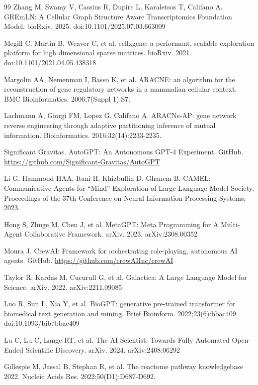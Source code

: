 \documentclass[11pt]{article}
\begin{document}
\begin{thebibliography}{99}
Zhang M, Swamy V, Cassius R, Dupire L, Karaletsos T, Califano A. GREmLN: A Cellular Graph Structure Aware Transcriptomics Foundation Model. bioRxiv. 2025. doi:10.1101/2025.07.03.663009

Megill C, Martin B, Weaver C, et al. cellxgene: a performant, scalable exploration platform for high dimensional sparse matrices. bioRxiv. 2021. doi:10.1101/2021.04.05.438318

Margolin AA, Nemenman I, Basso K, et al. ARACNE: an algorithm for the reconstruction of gene regulatory networks in a mammalian cellular context. BMC Bioinformatics. 2006;7(Suppl 1):S7.

Lachmann A, Giorgi FM, Lopez G, Califano A. ARACNe-AP: gene network reverse engineering through adaptive partitioning inference of mutual information. Bioinformatics. 2016;32(14):2233-2235.

Significant Gravitas. AutoGPT: An Autonomous GPT-4 Experiment. GitHub. \url{https://github.com/Significant-Gravitas/AutoGPT}

Li G, Hammoud HAA, Itani H, Khizbullin D, Ghanem B. CAMEL: Communicative Agents for ``Mind'' Exploration of Large Language Model Society. Proceedings of the 37th Conference on Neural Information Processing Systems; 2023.

Hong S, Zhuge M, Chen J, et al. MetaGPT: Meta Programming for A Multi-Agent Collaborative Framework. arXiv. 2023. arXiv:2308.00352

Moura J. CrewAI: Framework for orchestrating role-playing, autonomous AI agents. GitHub. \url{https://github.com/crewAIInc/crewAI}

Taylor R, Kardas M, Cucurull G, et al. Galactica: A Large Language Model for Science. arXiv. 2022. arXiv:2211.09085

Luo R, Sun L, Xia Y, et al. BioGPT: generative pre-trained transformer for biomedical text generation and mining. Brief Bioinform. 2022;23(6):bbac409. doi:10.1093/bib/bbac409

Lu C, Lu C, Lange RT, et al. The AI Scientist: Towards Fully Automated Open-Ended Scientific Discovery. arXiv. 2024. arXiv:2408.06292

Gillespie M, Jassal B, Stephan R, et al. The reactome pathway knowledgebase 2022. Nucleic Acids Res. 2022;50(D1):D687-D692.


\end{thebibliography}
\end{document}
